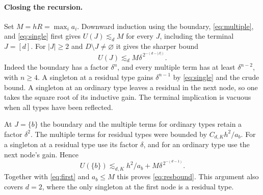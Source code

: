 \documentclass[11pt]{article}
\begin{document}
\paragraph{Closing the recursion.}
Set \(M=hR=\max_i a_i\). Downward induction using the boundary,
\eqref{eq:multiple}, and \eqref{eq:single} first gives
\(U(J)\lesssim_d M\) for every \(J\), including the terminal
\(J=[d]\). For \(|J|\ge2\) and \(D\setminus J\ne\varnothing\) it gives
the sharper bound
\[
        U(J)\lesssim_d M\delta^{\,2^{-(d-|J|)}} .
\]
Indeed the boundary has a factor \(\delta^n\), and every multiple
term has at least \(\delta^{n-2}\), with \(n\ge4\).
A singleton at a residual type gains \(\delta^{n-1}\) by
\eqref{eq:single} and the crude bound. A singleton at an ordinary
type leaves a residual in the next node, so one takes the square
root of its inductive gain. The terminal implication is vacuous
when all types have been reflected.

At \(J=\{b\}\) the boundary and the multiple terms for ordinary
types retain a factor \(\delta^2\). The multiple terms for residual
types were bounded by \(C_{d,K}h^2/a_b\). For a singleton at a
residual type use its factor \(\delta\), and for an ordinary type
use the next node's gain. Hence
\[
 U(\{b\})\lesssim_{d,K}h^2/a_b+M\delta^{\,2^{-(d-1)}}.
\]
Together with \eqref{eq:first} and \(a_b\le M\) this proves
\eqref{eq:resbound}. This argument also covers \(d=2\), where
the only singleton at the first node is a residual type.
\end{document}
